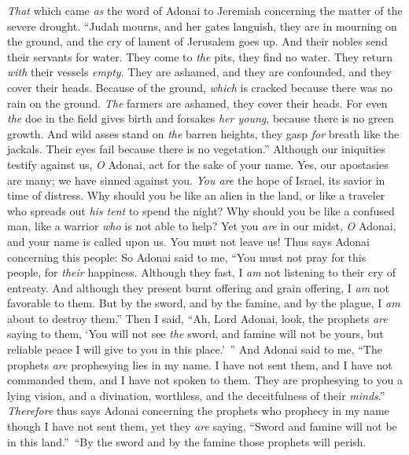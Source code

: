 \begin{biblechapter} %
 \textit{That} which came \textit{as} the word of Adonai to Jeremiah concerning the matter of the severe drought.
\verse “Judah mourns, and her gates languish, 
they are in mourning on the ground, 
and the cry of lament of Jerusalem goes up.
\verse And their nobles send their servants for water. 
They come to \textit{the} pits, they find no water. 
They return \textit{with} their vessels \textit{empty}. 
They are ashamed, and they are confounded, 
and they cover their heads.
\verse Because of the ground, \textit{which} is cracked 
because there was no rain on the ground. 
\textit{The} farmers are ashamed, 
they cover their heads.
\verse For even \textit{the} doe in the field gives birth and forsakes \textit{her young}, 
because there is no green growth.
\verse And wild asses stand on \textit{the} barren heights, 
they gasp \textit{for} breath like the jackals. 
Their eyes fail 
because there is no vegetation.”
\verse Although our iniquities testify against us, \textit{O} Adonai, 
act for the sake of your name. 
Yes, our apostasies are many; 
we have sinned against you.
\verse \textit{You are} the hope of Israel, 
its savior in time of distress. 
Why should you be like an alien in the land, 
or like a traveler who spreads out \textit{his tent}  to spend the night?
\verse Why should you be like a confused man, 
like a warrior \textit{who} is not able to help? 
Yet you \textit{are} in our midst, \textit{O} Adonai, 
and your name is called upon us. 
You must not leave us!
\verse Thus says Adonai concerning this people:
 So Adonai said to me, “You must not pray for this people, for \textit{their} happiness.
\verse Although they fast, I \textit{am} not listening to their cry of entreaty. And although they present burnt offering and grain offering, I \textit{am} not favorable to them. But by the sword, and by the famine, and by the plague, I \textit{am} about to destroy them.”
\verse Then I said, “Ah, Lord Adonai, look, the prophets \textit{are} saying to them, ‘You will not see \textit{the} sword, and famine will not be yours, but reliable peace I will give to you in this place.’ ”
\verse And Adonai said to me, “The prophets \textit{are} prophesying lies in my name. I have not sent them, and I have not commanded them, and I have not spoken to them. They are prophesying to you a lying vision, and a divination, worthless, and the deceitfulness of their \textit{minds}.”
\verse \textit{Therefore} thus says Adonai concerning the prophets who prophecy in my name though I have not sent them, yet they \textit{are} saying, “Sword and famine will not be in this land.” “By the sword and by the famine those prophets will perish.

\end{biblechapter}
